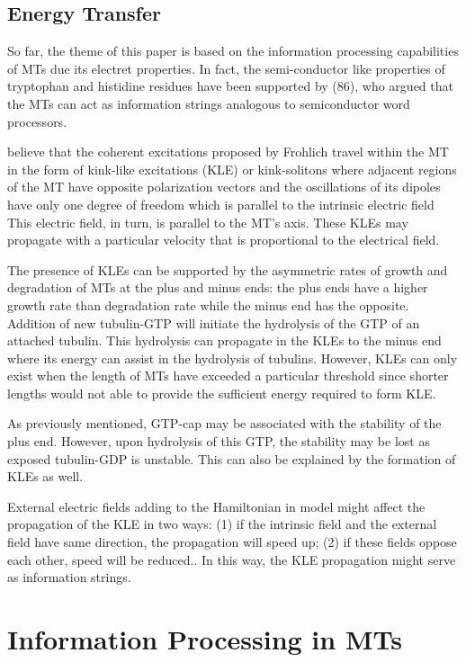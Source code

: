 \documentclass[letterpaper,final,times]{cas-dc}
\numberwithin{equation}{section}
\begin{document}
\subsection{Energy Transfer}\noindent
So far, the theme of this paper is based on the information processing capabilities of MTs due its electret properties. In fact, the semi-conductor like properties of tryptophan and histidine residues have been supported by (86), who argued that the MTs can act as information strings analogous to semiconductor word processors.

\citet{87} believe that the coherent excitations proposed by Frohlich travel within the MT in the form of kink-like excitations (KLE) or kink-solitons where adjacent regions of the MT have opposite polarization vectors and the oscillations of its dipoles have only one degree of freedom which is parallel to the intrinsic electric field This electric field, in turn, is parallel to the MT’s axis. These KLEs may propagate with a particular velocity that is proportional to the electrical field.

The presence of KLEs can be supported by the asymmetric rates of growth and degradation of MTs at the plus and minus ends: the plus ends have a higher growth rate than degradation rate while the minus end has the opposite. Addition of new tubulin-GTP will initiate the hydrolysis of the GTP of an attached tubulin. This hydrolysis can propagate in the KLEs to the minus end where its energy can assist in the hydrolysis of tubulins. However, KLEs can only exist when the length of MTs have exceeded a particular threshold since shorter lengths would not able to provide the sufficient energy required to form KLE.

As previously mentioned, GTP-cap may be associated with the stability of the plus end. However, upon hydrolysis of this GTP, the
stability may be lost as exposed tubulin-GDP is unstable. This can also be explained by the formation of KLEs as well.

External electric fields adding to the Hamiltonian in \citep{87} model might affect the propagation of the KLE in two ways: (1) if the intrinsic field and the external field have same direction, the propagation will speed up; (2) if these fields oppose each other, speed will be reduced.. In this way, the KLE propagation might serve as information strings.

\section{Information Processing in MTs}
\end{document}
